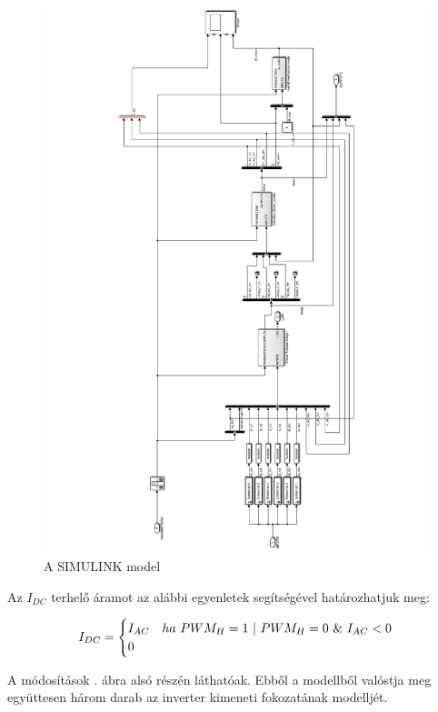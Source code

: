 \begin{figure}[]
	\centering
	\includegraphics[width = \textwidth]{figures/hil_model.pdf}
	\caption{A SIMULINK model} 
	\label{fig:original_model}
\end{figure}

Az $I_{DC}$ terhelő áramot az alábbi egyenletek segítségével határozhatjuk meg:

\begin{equation}
\centering
I_{DC}
=
\begin{cases}
I_{AC}   & ha \  PWM_H = 1 \  | \  PWM_H = 0 \  \& \  I_{AC} < 0 \\
0 & 
\end{cases}   
\end{equation}

A módosítások . ábra alsó részén láthatóak. Ebből a modellből valóstja meg együttesen három darab az inverter kimeneti fokozatának modelljét. 


